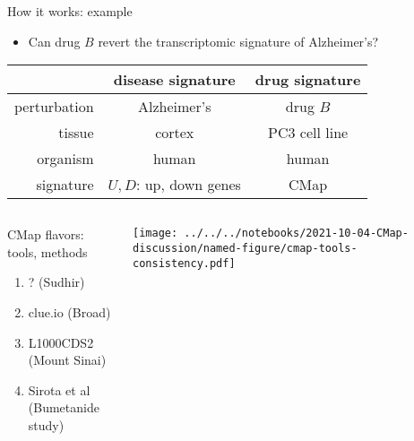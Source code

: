 \documentclass[aspectratio=169]{beamer}
\begin{document}
\begin{frame}{How it works: example}
\begin{itemize}
  \item Can drug $B$ revert the transcriptomic signature of Alzheimer's?
\end{itemize}
\vfill
\begin{tabular}{r|cc|}
  & disease signature & drug signature \\
  \hline
  perturbation & Alzheimer's & drug $B$ \\
  tissue & cortex & PC3 cell line \\
  organism & human & human\\
  signature & $U, D$: up, down genes & CMap \\
  \hline
\end{tabular}
\end{frame}

\begin{frame}{}
\begin{columns}[t]
\begin{column}{0.45\textwidth}
CMap flavors: tools, methods
\begin{enumerate}
\item ?  (Sudhir)
\item clue.io (Broad)
\item L1000CDS2 (Mount Sinai)
\item Sirota et al (Bumetanide study)
\end{enumerate}
\end{column}

\begin{column}{0.55\textwidth}

  \texttt{[image: ../../../notebooks/2021-10-04-CMap-discussion/named-figure/cmap-tools-consistency.pdf]}
\end{column}
\end{columns}
\end{frame}
\end{document}
